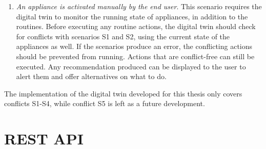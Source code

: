 \begin{enumerate}[label={\textit{S\arabic*.}}, leftmargin=3.5em]
    \item \textit{An appliance is activated manually by the end user}. This scenario requires the digital twin to monitor the running state of appliances, in addition to the routines. Before executing any routine actions, the digital twin should check for conflicts with scenarios S1 and S2, using the current state of the appliances as well. If the scenarios produce an error, the conflicting actions should be prevented from running. Actions that are conflict-free can still be executed. Any recommendation produced can be displayed to the user to alert them and offer alternatives on what to do.
\end{enumerate}
The implementation of the digital twin developed for this thesis only covers conflicts S1-S4, while conflict S5 is left as a future development.

\section{REST API}

